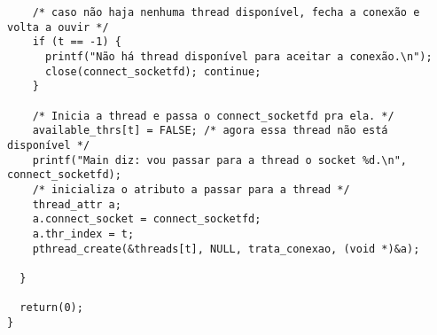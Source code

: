 \documentclass[11pt,twoside]{article}
\begin{document}
\begin{verbatim}
    /* caso não haja nenhuma thread disponível, fecha a conexão e volta a ouvir */
    if (t == -1) { 
      printf("Não há thread disponível para aceitar a conexão.\n");
      close(connect_socketfd); continue;
    }

    /* Inicia a thread e passa o connect_socketfd pra ela. */
    available_thrs[t] = FALSE; /* agora essa thread não está disponível */
    printf("Main diz: vou passar para a thread o socket %d.\n", connect_socketfd);
    /* inicializa o atributo a passar para a thread */
    thread_attr a;
    a.connect_socket = connect_socketfd;
    a.thr_index = t;
    pthread_create(&threads[t], NULL, trata_conexao, (void *)&a);

  }

  return(0);
}
\end{verbatim}


\end{document}
